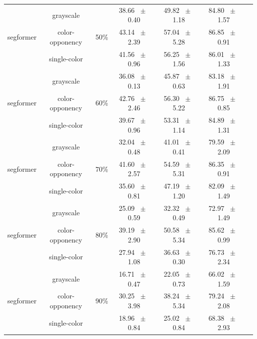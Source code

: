 \begin{table}[h]
\begin{tabular}{@{}lccc ccc@{}}
    \midrule
    \multirow{3}{*}{segformer} & grayscale & \multirow{3}{*}{50\%} & 38.66 ~$\pm$~ 0.40 & 49.82 ~$\pm$~ 1.18 & 84.80 ~$\pm$~ 1.57 \\
    & color-opponency &  & 43.14 ~$\pm$~ 2.39 & 57.04 ~$\pm$~ 5.28 & 86.85 ~$\pm$~ 0.91 \\
    & single-color &  & 41.56 ~$\pm$~ 0.96 & 56.25 ~$\pm$~ 1.56 & 86.01 ~$\pm$~ 1.33 \\
    \midrule
    \multirow{3}{*}{segformer} & grayscale & \multirow{3}{*}{60\%} & 36.08 ~$\pm$~ 0.13 & 45.87 ~$\pm$~ 0.63 & 83.18 ~$\pm$~ 1.91 \\
    & color-opponency &  & 42.76 ~$\pm$~ 2.46 & 56.30 ~$\pm$~ 5.22 & 86.75 ~$\pm$~ 0.85 \\
    & single-color &  & 39.67 ~$\pm$~ 0.96 & 53.31 ~$\pm$~ 1.14 & 84.89 ~$\pm$~ 1.31 \\
    \midrule
    \multirow{3}{*}{segformer} & grayscale & \multirow{3}{*}{70\%} & 32.04 ~$\pm$~ 0.48 & 41.01 ~$\pm$~ 0.41 & 79.59 ~$\pm$~ 2.09 \\
    & color-opponency &  & 41.60 ~$\pm$~ 2.57 & 54.59 ~$\pm$~ 5.31 & 86.35 ~$\pm$~ 0.91 \\
    & single-color &  & 35.60 ~$\pm$~ 0.81 & 47.19 ~$\pm$~ 1.20 & 82.09 ~$\pm$~ 1.49 \\
    \midrule
    \multirow{3}{*}{segformer} & grayscale & \multirow{3}{*}{80\%} & 25.09 ~$\pm$~ 0.59 & 32.32 ~$\pm$~ 0.49 & 72.97 ~$\pm$~ 1.49 \\
    & color-opponency &  & 39.19 ~$\pm$~ 2.90 & 50.58 ~$\pm$~ 5.34 & 85.62 ~$\pm$~ 0.99 \\
    & single-color &  & 27.94 ~$\pm$~ 1.08 & 36.63 ~$\pm$~ 0.30 & 76.73 ~$\pm$~ 2.34 \\
    \midrule
    \multirow{3}{*}{segformer} & grayscale & \multirow{3}{*}{90\%} & 16.71 ~$\pm$~ 0.47 & 22.05 ~$\pm$~ 0.73 & 66.02 ~$\pm$~ 1.59 \\
    & color-opponency &  & 30.25 ~$\pm$~ 3.98 & 38.24 ~$\pm$~ 5.34 & 79.24 ~$\pm$~ 2.08 \\
    & single-color &  & 18.96 ~$\pm$~ 0.84 & 25.02 ~$\pm$~ 0.84 & 68.38 ~$\pm$~ 2.93 \\
    \midrule
    \bottomrule
  \end{tabular}
  \label{tab:sparse_results_segformer_acdc_rain}
\end{table}